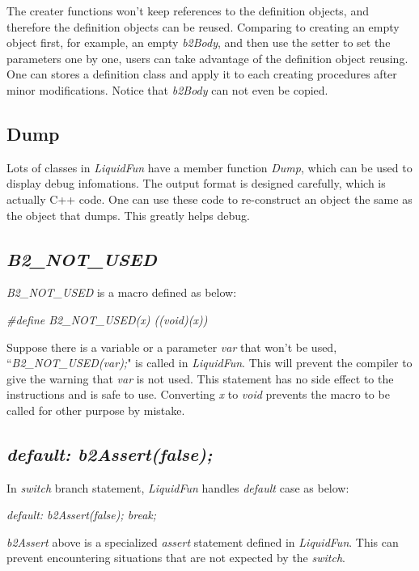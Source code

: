 \documentclass[UTF8]{ctexart}
\begin{document}
            The creater functions won't keep references to the definition objects, and therefore the definition objects can be reused. Comparing to creating an empty object first, for example, an empty \textit{b2Body}, and then use the setter to set the parameters one by one, users can take advantage of the definition object reusing. One can stores a definition class and apply it to each creating procedures after minor modifications. Notice that \textit{b2Body} can not even be copied.

        \subsection{Dump}

            Lots of classes in \textit{LiquidFun} have a member function \textit{Dump}, which can be used to display debug infomations. The output format is designed carefully, which is actually C++ code. One can use these code to re-construct an object the same as the object that dumps. This greatly helps debug.

        \subsection{\textit{B2\_NOT\_USED}}

            \textit{B2\_NOT\_USED} is a macro defined as below:

            \textit{\#define B2\_NOT\_USED(x) ((void)(x))}

            Suppose there is a variable or a parameter \textit{var} that won't be used, ``\textit{B2\_NOT\_USED(var);}" is called in \textit{LiquidFun}. This will prevent the compiler to give the warning that \textit{var} is not used. This statement has no side effect to the instructions and is safe to use. Converting \textit{x} to \textit{void} prevents the macro to be called for other purpose by mistake.

        \subsection{\textit{default: b2Assert(false);}}

            In \textit{switch} branch statement, \textit{LiquidFun} handles \textit{default} case as below:

            \textit{default: b2Assert(false); break;}

            \textit{b2Assert} above is a specialized \textit{assert} statement defined in \textit{LiquidFun}. This can prevent encountering situations that are not expected by the \textit{switch}.
\end{document}
